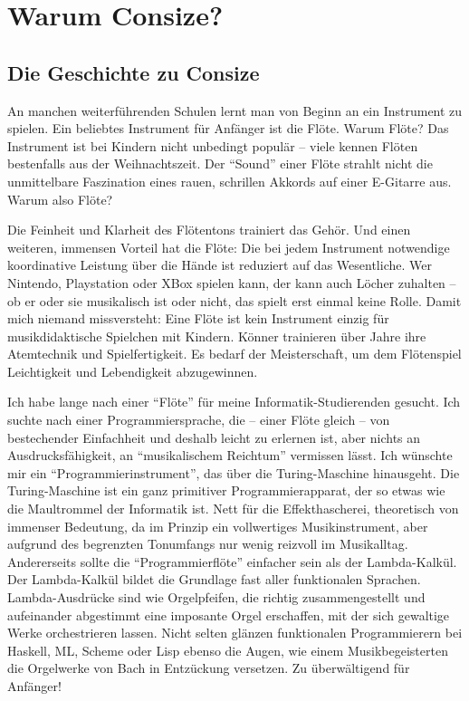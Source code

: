 \chapter{Warum Consize?}

\section{Die Geschichte zu Consize}

An manchen weiterführenden Schulen lernt man von Beginn an ein Instrument zu spielen. Ein beliebtes Instrument für Anfänger ist die Flöte. Warum Flöte? Das Instrument ist bei Kindern nicht unbedingt populär -- viele kennen Flöten bestenfalls aus der Weihnachtszeit. Der "`Sound"' einer Flöte strahlt nicht die unmittelbare Faszination eines rauen, schrillen Akkords auf einer E-Gitarre aus. Warum also Flöte?

Die Feinheit und Klarheit des Flötentons trainiert das Gehör. Und einen weiteren, immensen Vorteil hat die Flöte: Die bei jedem Instrument notwendige koordinative Leistung über die Hände ist reduziert auf das Wesentliche. Wer Nintendo, Playstation oder XBox spielen kann, der kann auch Löcher zuhalten -- ob er oder sie musikalisch ist oder nicht, das spielt erst einmal keine Rolle. Damit mich niemand missversteht: Eine Flöte ist kein Instrument einzig für musikdidaktische Spielchen mit Kindern. Könner trainieren über Jahre ihre Atemtechnik und Spielfertigkeit. Es bedarf der Meisterschaft, um dem Flötenspiel Leichtigkeit und Lebendigkeit abzugewinnen.

Ich habe lange nach einer "`Flöte"' für meine Informatik-Studierenden gesucht. Ich suchte nach einer Programmiersprache, die -- einer Flöte gleich -- von bestechender Einfachheit und deshalb leicht zu erlernen ist, aber nichts an Ausdrucksfähigkeit, an "`musikalischem Reichtum"' vermissen lässt.
Ich wünschte mir ein "`Programmierinstrument"', das über die Turing-Maschine hinausgeht. Die Turing-Maschine ist ein ganz primitiver Programmierapparat, der so etwas wie die Maultrommel der Informatik ist. Nett für die Effekthascherei, theoretisch von immenser Bedeutung, da im Prinzip ein vollwertiges Musikinstrument, aber aufgrund des begrenzten Tonumfangs nur wenig reizvoll im Musikalltag. Andererseits sollte die "`Programmierflöte"' einfacher sein als der Lambda-Kalkül. Der Lambda-Kalkül bildet die Grundlage fast aller funktionalen Sprachen. Lambda-Ausdrücke sind wie Orgelpfeifen, die richtig zusammengestellt und aufeinander abgestimmt eine imposante Orgel erschaffen, mit der sich gewaltige Werke orchestrieren lassen. Nicht selten glänzen funktionalen Programmierern bei Haskell, ML, Scheme oder Lisp ebenso die Augen, wie einem Musikbegeisterten die Orgelwerke von Bach in Entzückung versetzen. Zu überwältigend für Anfänger!

